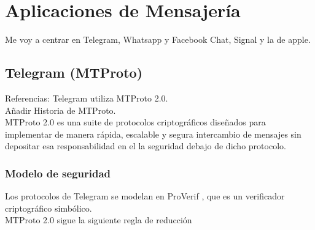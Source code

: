 \chapter{Aplicaciones de Mensajería}

Me voy a centrar en Telegram, Whatsapp y Facebook Chat, Signal y la de apple.

\section{Telegram (MTProto)}

Referencias: \cite{Miculan2021}
Telegram utiliza MTProto 2.0. \\
Añadir Historia de MTProto. \\ 

MTProto 2.0 es una suite de protocolos criptográficos diseñados para implementar de manera rápida, escalable y segura intercambio de mensajes sin depositar esa responsabilidad en el la seguridad debajo de dicho protocolo.

\subsection{Modelo de seguridad}
Los protocolos de Telegram se modelan en ProVerif \cite{ProVer}, que es un verificador criptográfico simbólico. \\
MTProto 2.0 sigue la siguiente regla de reducción


	
